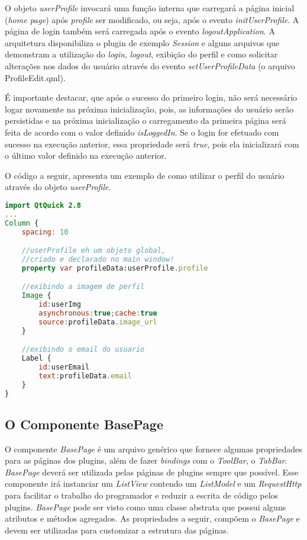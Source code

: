 O objeto \textit{userProfile} invocará uma função interna que carregará a página inicial (\textit{home page}) após \textit{profile} ser modificado, ou seja, após o evento \textit{initUserProfile}. A página de login também será carregada após o evento \textit{logoutApplication}. A arquitetura disponibiliza o plugin de exemplo \textit{Session} e alguns arquivos que demonstram a utilização do \textit{login}, \textit{logout}, exibição do perfil e como solicitar alterações nos dados do usuário através do evento \textit{setUserProfileData} (o arquivo ProfileEdit.qml).\par

É importante destacar, que após o sucesso do primeiro login, não será necessário logar novamente na próxima inicialização, pois, as informações do usuário serão persistidas e na próxima inicialização o carregamento da primeira página será feita de acordo com o valor definido \textit{isLoggedIn}. Se o login for efetuado com sucesso na execução anterior, essa propriedade será \textit{true}, pois ela inicializará com o último valor definido na execução anterior.\par

O código a seguir, apresenta um exemplo de como utilizar o perfil do usuário através do objeto \textit{userProfile}.

\begin{center}
\begin{lstlisting}[language=qml]
import QtQuick 2.8
...
Column {
	spacing: 10

	//userProfile eh um objeto global,
	//criado e declarado no main window!
	property var profileData:userProfile.profile

	//exibindo a imagem de perfil
	Image {
		id:userImg
		asynchronous:true;cache:true
		source:profileData.image_url
	}

	//exibindo o email do usuario
	Label {
		id:userEmail
		text:profileData.email
	}
}
\end{lstlisting}
\end{center}


\subsection{O Componente BasePage}\label{sec:solucao-desenvolvida}
O componente \textit{BasePage} é um arquivo genérico que fornece algumas propriedades para as páginas dos plugins, além de fazer \textit{bindings} com o \textit{ToolBar}, o \textit{TabBar}. \textit{BasePage} deverá ser utilizada pelas páginas de plugins sempre que possível. Esse componente irá instanciar um \textit{ListView} contendo um \textit{ListModel} e um \textit{RequestHttp} para facilitar o trabalho do programador e reduzir a escrita de código pelos plugins. \textit{BasePage} pode ser visto como uma classe abstrata que possui alguns atributos e métodos agregados. As propriedades a seguir, compõem o \textit{BasePage} e devem ser utilizadas para customizar a estrutura das páginas.

